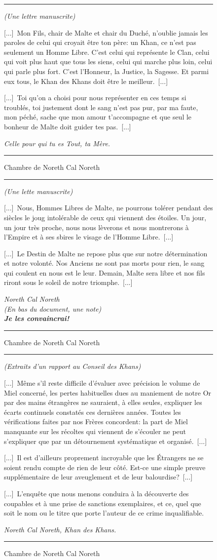 \documentclass{article}
\newcommand{\indice}[4]{
  \begin{figure}[H]
    \begin{center}
      \rule{0.5\textwidth}{1pt}
    \end{center}
    \begin{framed}
      \begin{samepage}
        \textit{#1}
        \nopagebreak

        #2

        \nopagebreak

        \hfill\textit{#3}
      \end{samepage}
    \end{framed}
    \caption{#4}
    \begin{center}
      \rule{0.5\textwidth}{1pt}
    \end{center}
  \end{figure}
}
\begin{document}
\indice
{(Une lettre manuscrite)}
{
    [...]~Mon Fils, chair de Malte et chair du Duché, n'oublie jamais les
    paroles de celui qui croyait être ton père: \og un Khan, ce n'est pas
    seulement un Homme Libre. C'est celui qui représente le Clan, celui qui
    voit plus haut que tous les siens, celui qui marche plus loin, celui qui
    parle plus fort. C'est l'Honneur, la Justice, la Sagesse. Et parmi eux
    tous, le Khan des Khans doit être le meilleur\fg{}.~[...]

    \nobreak

    [...]~Toi qu'on a choisi pour nous représenter en ces temps si troublés,
    toi justement dont le sang n'est pas pur, par ma faute, mon péché, sache
    que mon amour t'accompagne et que seul le bonheur de Malte doit guider tes
    pas.~[...]
}{Celle pour qui tu es Tout, ta Mère.}
{Chambre de Noreth Cal Noreth}

\indice
{(Une lette manuscrite)}
{
    [...]~Nous, Hommes Libres de Malte, ne pourrons tolérer pendant des siècles
    le joug intolérable de ceux qui viennent des étoiles. Un jour, un jour très
    proche, nous nous lèverons et nous montrerons à l'Empire et à ses sbires le
    visage de l'Homme Libre.~[...]

    \nobreak

    [...]~Le Destin de Malte ne repose plus que sur notre détermination et
    notre volonté. Nos Anciens ne sont pas morts pour rien, le sang qui coulent
    en nous est le leur. Demain, Malte sera libre et nos fils riront sous le
    soleil de notre triomphe.~[...]
}{Noreth Cal Noreth\\
(En bas du document, une note)\\
\textbf{Je les convaincrai!}}
{Chambre de Noreth Cal Noreth}

\indice
{(Extraits d'un rapport au Conseil des Khans)}
{
    [...]~Même s'il reste difficile d'évaluer avec précision le volume de Miel
    concerné, les pertes habituelles dues au maniement de notre Or par des
    mains étrangères ne sauraient, à elles seules, expliquer les écarts
    continuels constatés ces dernières années. Toutes les vérifications faites
    par nos Frères concordent: la part de Miel manquante sur les récoltes qui
    viennent de s'écouler ne peut s'expliquer que par un détournement
    systématique et organisé.~[...]

    \nobreak

    [...]~Il est d'ailleurs proprement incroyable que les Étrangers ne se
    soient rendu compte de rien de leur côté. Est-ce une simple preuve
    supplémentaire de leur aveuglement et de leur balourdise?~[...]

    \nobreak

    [...]~L'enquête que nous menons conduira à la découverte des coupables et à
    une prise de sanctions exemplaires, et ce, quel que soit le nom ou le titre
    que porte l'auteur de ce crime inqualifiable.
}{Noreth Cal Noreth, Khan des Khans.}
{Chambre de Noreth Cal Noreth}
\end{document}
